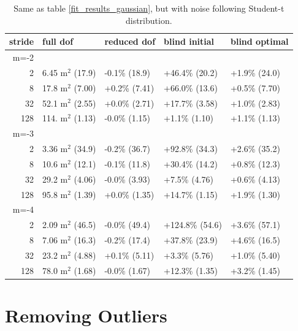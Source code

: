 \documentclass[10pt,journal]{IEEEtran}
\begin{document}
\begin{table}[ht]
\caption{Same as table \ref{fit_results_gaussian}, but with noise following Student-t distribution.}
\label{fit_results_tdistribution}
\centering
\begin{tabular}{r | llll} stride & full dof & reduced dof & blind initial & blind optimal \\ \hline \hline 
m=-2 &&&&  \\ \hline 
2 & 6.45 m$^2$ (17.9) &  -0.1\% (18.9) &  +46.4\% (20.2) &  +1.9\% (24.0) \\ 
8 & 17.8 m$^2$ (7.00) &  +0.2\% (7.41) &  +66.0\% (13.6) &  +0.5\% (7.70) \\ 
32 & 52.1 m$^2$ (2.55) &  +0.0\% (2.71) &  +17.7\% (3.58) &  +1.0\% (2.83) \\ 
128 & 114. m$^2$ (1.13) &  -0.0\% (1.15) &  +1.1\% (1.10) &  +1.1\% (1.13) \\ 
m=-3 &&&&  \\ \hline 
2 & 3.36 m$^2$ (34.9) &  -0.2\% (36.7) &  +92.8\% (34.3) &  +2.6\% (35.2) \\ 
8 & 10.6 m$^2$ (12.1) &  -0.1\% (11.8) &  +30.4\% (14.2) &  +0.8\% (12.3) \\ 
32 & 29.2 m$^2$ (4.06) &  -0.0\% (3.93) &  +7.5\% (4.76) &  +0.6\% (4.13) \\ 
128 & 95.8 m$^2$ (1.39) &  +0.0\% (1.35) &  +14.7\% (1.15) &  +1.9\% (1.30) \\ 
m=-4 &&&&  \\ \hline 
2 & 2.09 m$^2$ (46.5) &  -0.0\% (49.4) &  +124.8\% (54.6) &  +3.6\% (57.1) \\ 
8 & 7.06 m$^2$ (16.3) &  -0.2\% (17.4) &  +37.8\% (23.9) &  +4.6\% (16.5) \\ 
32 & 23.2 m$^2$ (4.88) &  +0.1\% (5.11) &  +3.3\% (5.76) &  +1.0\% (5.40) \\ 
128 & 78.0 m$^2$ (1.68) &  -0.0\% (1.67) &  +12.3\% (1.35) &  +3.2\% (1.45) \\ 
\end{tabular} 

\end{table}

\section{Removing Outliers}
\label{sec:outliers}
\end{document}
